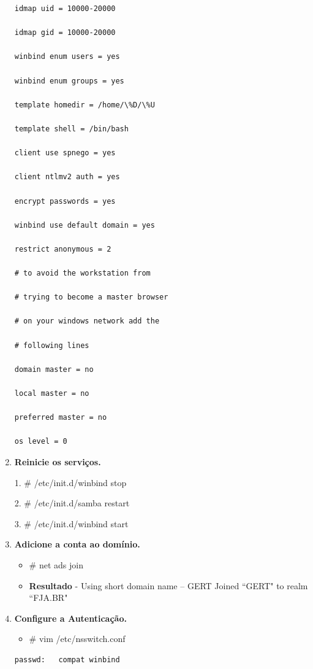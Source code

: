 \begin{enumerate}
\begin{lstlisting}
idmap uid = 10000-20000

idmap gid = 10000-20000

winbind enum users = yes

winbind enum groups = yes

template homedir = /home/\%D/\%U

template shell = /bin/bash

client use spnego = yes

client ntlmv2 auth = yes

encrypt passwords = yes

winbind use default domain = yes

restrict anonymous = 2

# to avoid the workstation from

# trying to become a master browser

# on your windows network add the

# following lines

domain master = no

local master = no

preferred master = no

os level = 0
\end{lstlisting}

	\item \textbf{Reinicie os serviços.}
	
			1. \# /etc/init.d/winbind stop
			
			2. \# /etc/init.d/samba restart
			
			3. \# /etc/init.d/winbind start

	\item \textbf{Adicione a conta ao domínio.}\\
		\begin{itemize}
			\item \# net ads join
		\end{itemize} 
		\begin{itemize}
			\item \textbf{Resultado} - Using short domain name – GERT Joined ``GERT" to realm ``FJA.BR"
		\end{itemize}

	\item \textbf{Configure a Autenticação.}
		\begin{itemize}
				\item \# vim /etc/nsswitch.conf\\
		\end{itemize}
		\begin{lstlisting}
passwd:   compat winbind


\end{lstlisting}
\end{enumerate}
